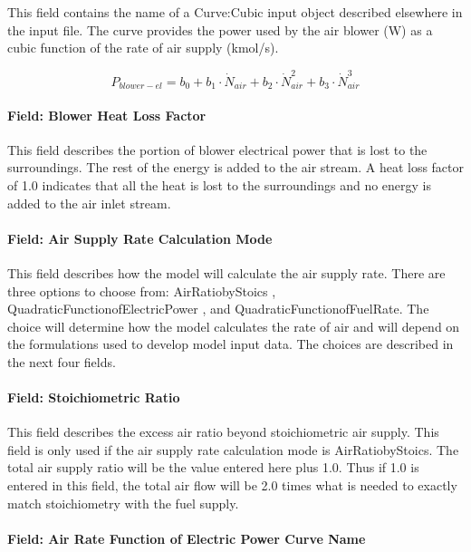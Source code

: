 This field contains the name of a Curve:Cubic input object described elsewhere in the input file. The curve provides the power used by the air blower (W) as a cubic function of the rate of air supply (kmol/s).

\begin{equation}
{P_{blower - el}} = {b_0} + {b_1} \cdot {\dot N_{air}} + {b_2} \cdot \dot N_{air}^2 + {b_3} \cdot \dot N_{air}^3
\end{equation}

\paragraph{Field: Blower Heat Loss Factor}\label{field-blower-heat-loss-factor}

This field describes the portion of blower electrical power that is lost to the surroundings. The rest of the energy is added to the air stream. A heat loss factor of 1.0 indicates that all the heat is lost to the surroundings and no energy is added to the air inlet stream.

\paragraph{Field: Air Supply Rate Calculation Mode}\label{field-air-supply-rate-calculation-mode}

This field describes how the model will calculate the air supply rate. There are three options to choose from: AirRatiobyStoics , QuadraticFunctionofElectricPower , and QuadraticFunctionofFuelRate. The choice will determine how the model calculates the rate of air and will depend on the formulations used to develop model input data. The choices are described in the next four fields.

\paragraph{Field: Stoichiometric Ratio}\label{field-stoichiometric-ratio}

This field describes the excess air ratio beyond stoichiometric air supply. This field is only used if the air supply rate calculation mode is AirRatiobyStoics. The total air supply ratio will be the value entered here plus 1.0. Thus if 1.0 is entered in this field, the total air flow will be 2.0 times what is needed to exactly match stoichiometry with the fuel supply.

\paragraph{Field: Air Rate Function of Electric Power Curve Name}\label{field-air-rate-function-of-electric-power-curve-name}

